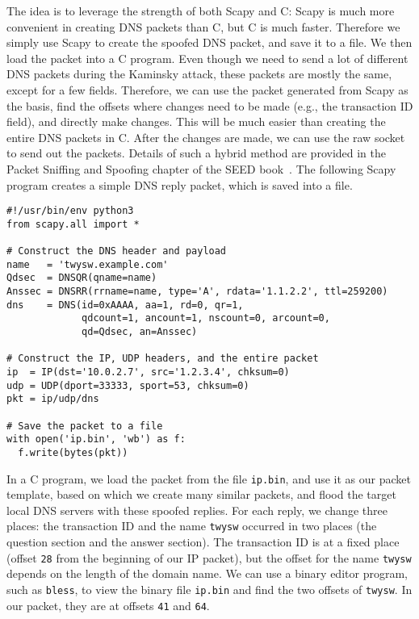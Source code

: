 The idea is to leverage the strength of both Scapy and C: Scapy is much more convenient in
creating DNS packets than C, but C is much faster. Therefore we simply
use Scapy to create the spoofed DNS packet, and save it to a file.
We then load the packet into a C program. Even though we need to send a 
lot of different DNS packets
during the Kaminsky attack, these packets are mostly the same, except for a few fields. 
Therefore, we can
use the packet generated from Scapy as the basis, find the offsets where
changes need to be made (e.g., the transaction ID field),
and directly make changes. This will be much easier than
creating the entire DNS packets in C.
After the changes are made, we can use the raw socket to send out the packets.
Details of such a hybrid method are provided in
the Packet Sniffing and Spoofing chapter 
of the SEED book~\cite{seedbook}.
The following Scapy program creates a simple DNS reply packet, 
which is saved into a file.


\begin{lstlisting}[caption={\texttt{generate\_dns\_reply.py}}]
#!/usr/bin/env python3
from scapy.all import *

# Construct the DNS header and payload
name   = 'twysw.example.com'
Qdsec  = DNSQR(qname=name)
Anssec = DNSRR(rrname=name, type='A', rdata='1.1.2.2', ttl=259200)
dns    = DNS(id=0xAAAA, aa=1, rd=0, qr=1, 
             qdcount=1, ancount=1, nscount=0, arcount=0, 
             qd=Qdsec, an=Anssec)

# Construct the IP, UDP headers, and the entire packet
ip  = IP(dst='10.0.2.7', src='1.2.3.4', chksum=0)
udp = UDP(dport=33333, sport=53, chksum=0)
pkt = ip/udp/dns

# Save the packet to a file
with open('ip.bin', 'wb') as f:
  f.write(bytes(pkt))
\end{lstlisting}

In a C program, we load the packet from the file \texttt{ip.bin}, and use
it as our packet template, based on which we create many similar packets,
and flood the target local DNS servers with these spoofed replies. For each
reply, we change three places: the transaction ID and the name
\texttt{twysw} occurred in two places (the question section and the answer
section).  The transaction ID is at a fixed place (offset  \texttt{28} from
the beginning of our IP packet), but the offset for the name \texttt{twysw}
depends on the length of the domain name. We can use a binary editor
program, such as \texttt{bless}, to view the binary file \texttt{ip.bin}
and find the two offsets of \texttt{twysw}. In our packet, they are at
offsets \texttt{41} and \texttt{64}.


